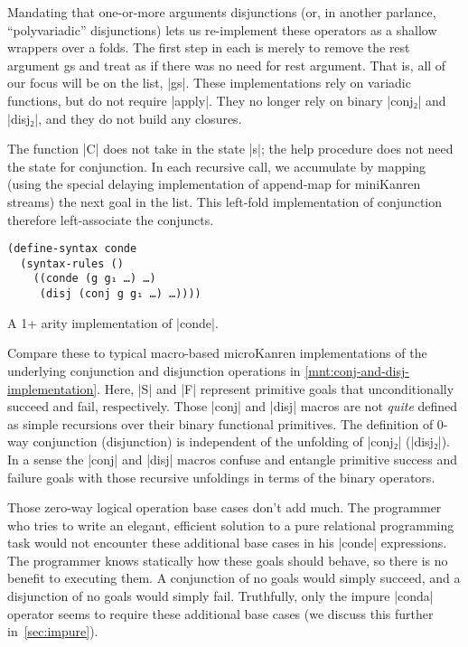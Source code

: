 \documentclass[sigplan,screen,draft,anonymous,review,natbib=false]{acmart}
\begin{document}
Mandating that one-or-more arguments disjunctions (or, in another
parlance, \enquote{polyvariadic} disjunctions) lets us re-implement
these operators as a shallow wrappers over a folds.
The first step in each is merely to remove the rest argument gs and treat as
if there was no need for rest argument.  That is, all of our focus
 will be on the list, \rackinline|gs|. These
implementations rely on variadic functions, but do not require
\rackinline|apply|. They no longer rely on binary \rackinline|conj₂|
and \rackinline|disj₂|, and they do not build any closures.


The
function \rackinline|C| does not take in the state \rackinline|s|; the
help procedure does not need the state for conjunction. In each
recursive call, we accumulate by mapping (using the special delaying
implementation of append-map for miniKanren streams) the next goal in
the list. This left-fold implementation of conjunction therefore
left-associate the conjuncts.

\begin{listing}
  \begin{verbatim}
(define-syntax conde
  (syntax-rules ()
    ((conde (g g₁ …) …)
     (disj (conj g g₁ …) …))))
  \end{verbatim}
\caption{A 1+ arity implementation of \rackinline|conde|.}
  \label{mnt:conde-implementation}
\end{listing}

Compare these to typical macro-based microKanren implementations of
the underlying conjunction and disjunction operations in
\cref{mnt:conj-and-disj-implementation}. Here, \rackinline|S| and
\rackinline|F| represent primitive goals that unconditionally succeed
and fail, respectively. Those \rackinline|conj| and \rackinline|disj|
macros are not \emph{quite} defined as simple recursions over their
binary functional primitives. The definition of 0-way conjunction
(disjunction) is independent of the unfolding of \rackinline|conj₂|
(\rackinline|disj₂|). In a sense the \rackinline|conj| and
\rackinline|disj| macros confuse and entangle primitive success and
failure goals with those recursive unfoldings in terms of the binary
operators.

Those zero-way logical operation base cases don't add much. The
programmer who tries to write an elegant, efficient solution to a pure
relational programming task would not encounter these additional base
cases in his \rackinline|conde| expressions. The programmer knows
statically how these goals should behave, so there is no benefit to
executing them. A conjunction of no goals would simply succeed, and a
disjunction of no goals would simply fail. Truthfully, only the impure
\rackinline|conda| operator seems to require these additional base
cases (we discuss this further in~\cref{sec:impure}).
\end{document}
